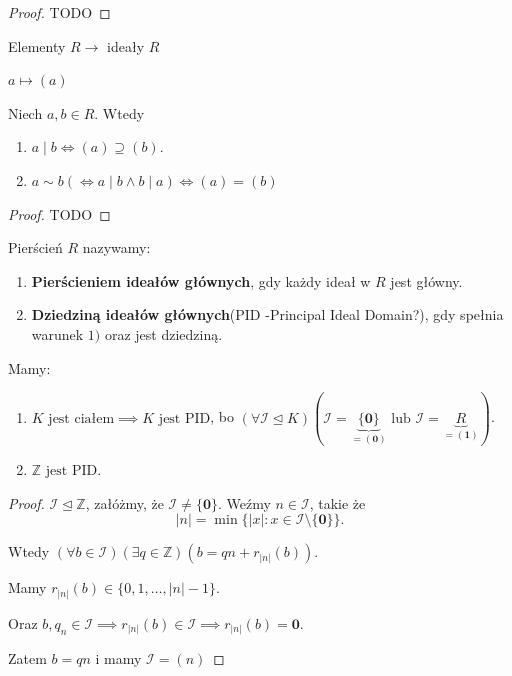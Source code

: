 \begin{proof}
	TODO
\end{proof} 
\begin{remark}
	Elementy $R \longrightarrow $ ideały $R$

	 $a \mapsto \left( a \right) $
\end{remark} 
\begin{fact}

	Niech $a,b \in R$. Wtedy
	\begin{enumerate}[label=\arabic*)]
		\item $a\mid b \iff \left( a \right) \supseteq \left( b \right) $.
		\item $a\sim b \left(\iff a\mid b \land b\mid a \right) \iff \left( a \right) = \left( b \right) $
	\end{enumerate}
\end{fact}
\begin{proof}
	TODO
\end{proof} 
\begin{definition}[PID]
	Pierścień $R$ nazywamy:
	\begin{enumerate}[label=\arabic*)]
		\item \textbf{Pierścieniem ideałów głównych}, gdy każdy ideał w $R$ jest główny.
		\item \textbf{Dziedziną ideałów głównych}(PID -Principal Ideal Domain?), gdy spełnia warunek $1)$ oraz jest dziedziną. 
	\end{enumerate}
\end{definition} 
\begin{eg}
	Mamy:
	\begin{enumerate}[label=\arabic*)]
		\item $K\text{ jest ciałem} \implies K \text{ jest PID}$, bo $\left(\forall \mathcal{I}\unlhd K \right)\left( \mathcal{I}= \underbrace{\{\mathbf{0}\} }_{= ( \mathbf{0} )} \text{ lub } \mathcal{I}= \underbrace{R}_{= (\mathbf{1})} \right)  $.
		\item $\mathbb{Z} \text{ jest PID}$.
	\end{enumerate}
\end{eg} 
\begin{proof}
	$\mathcal{I}\unlhd \mathbb{Z} $, załóżmy, że $\mathcal{I}\neq \{\mathbf{0}\} $. Weźmy $n\in \mathcal{I}$, takie że \[
	\left| n \right| = \min \{\left| x \right| : x\in \mathcal{I}\setminus \{\mathbf{0}\} \} 
	.\] 

	Wtedy 
	$\left(\forall b\in \mathcal{I} \right)\left(\exists q \in \mathbb{Z}  \right)\left( b = qn + r_{\left| n \right| }(b) \right)   .$ 

	Mamy $r_{\left| n \right| }(b) \in \{0,1,\ldots,\left| n \right| - 1\} $.

	Oraz $b, q_{n}\in \mathcal{I} \implies r_{\left| n \right| }(b) \in \mathcal{I}\implies r_{\left| n \right| }\left( b \right) = \mathbf{0}$.

	Zatem $b=qn$ i mamy $\mathcal{I} = \left( n \right) $
\end{proof} 

